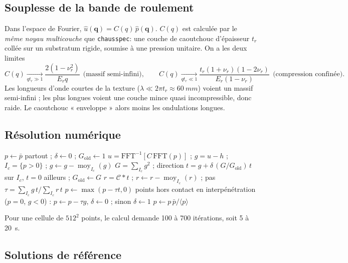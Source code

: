\documentclass[11pt,a4paper]{article}
\newcommand{\hatt}[1]{\widehat{#1}}
\newcommand{\cs}{\texttt{chausspec}}
\begin{document}
\subsection{Souplesse de la bande de roulement}
Dans l'espace de Fourier, $\hatt u(\bm q)=C(q)\,\hatt p(\bm q)$. $C(q)$ est calculée par le
\emph{même noyau multicouche} que \cs : une couche de caoutchouc d'épaisseur $t_r$ collée sur un
substratum rigide, soumise à une pression unitaire. On a les deux limites
\begin{equation}
C(q)\xrightarrow[qt_r\gg1]{}\frac{2(1-\nu_r^2)}{E_rq}\ \ \text{(massif semi-infini)},\qquad
C(q)\xrightarrow[qt_r\ll1]{}\frac{t_r(1+\nu_r)(1-2\nu_r)}{E_r(1-\nu_r)}\ \ \text{(compression confinée)} .
\end{equation}
Les longueurs d'onde courtes de la texture ($\lambda\ll2\pi t_r\approx\SI{60}{mm}$) voient un
massif semi-infini ; les plus longues voient une couche mince quasi incompressible, donc raide.
Le caoutchouc « enveloppe » alors moins les ondulations longues.

\subsection{Résolution numérique}
\begin{algorithm}[H]
\caption{Contact par gradient conjugué projeté (Polonsky \& Keer, 1999 ; \texttt{contact.solve\_contact})}
\begin{algorithmic}[1]
\State $p\leftarrow\bar p$ partout ; $\delta\leftarrow0$ ; $G_{\text{old}}\leftarrow1$
\Repeat
  \State $u=\mathrm{FFT}^{-1}[C\,\mathrm{FFT}(p)]$ ; $g=u-h$ ; $I_c=\{p>0\}$ ; $g\leftarrow g-\operatorname{moy}_{I_c}(g)$
  \State $G=\sum_{I_c}g^2$ ; direction $t=g+\delta\,(G/G_{\text{old}})\,t$ sur $I_c$, $t=0$ ailleurs ; $G_{\text{old}}\leftarrow G$
  \State $r=\mathcal C*t$ ; $r\leftarrow r-\operatorname{moy}_{I_c}(r)$ ; pas $\tau=\sum_{I_c}g\,t/\sum_{I_c}r\,t$
  \State $p\leftarrow\max(p-\tau t,0)$ 
  \State points hors contact en interpénétration ($p=0$, $g<0$) : $p\leftarrow p-\tau g$, $\delta\leftarrow0$ ; sinon $\delta\leftarrow1$
  \State $p\leftarrow p\,\bar p/\langle p\rangle$ 
\end{algorithmic}
\end{algorithm}
Pour une cellule de $512^2$ points, le calcul demande 100 à 700 itérations, soit 5 à
\SI{20}{s}.

\subsection{Solutions de référence}\label{sec:contact_ref}
\end{document}
